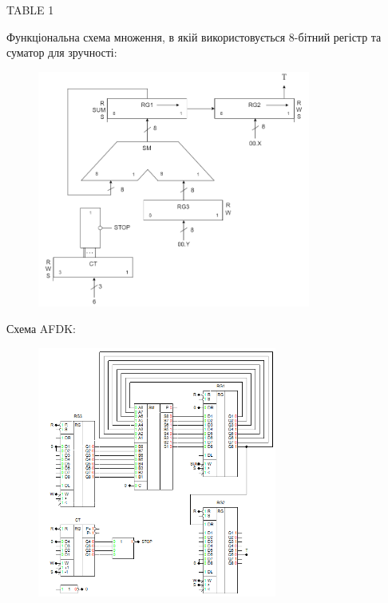 \documentclass[12pt,a4paper]{article}
\begin{document}
    \newpage

    TABLE 1

    \newpage

    Функціональна схема множення, в якій використовується 8-бітний регістр та суматор для зручності:

    \begin{figure}[ht]
        \includegraphics[width=0.8\textwidth]{multiply1_function_schemma.png}
    \end{figure}

    \newpage

    Схема AFDK:

    \begin{figure}[ht]
        \includegraphics[width=0.7\textwidth]{schemma1.png}
    \end{figure}
\end{document}
